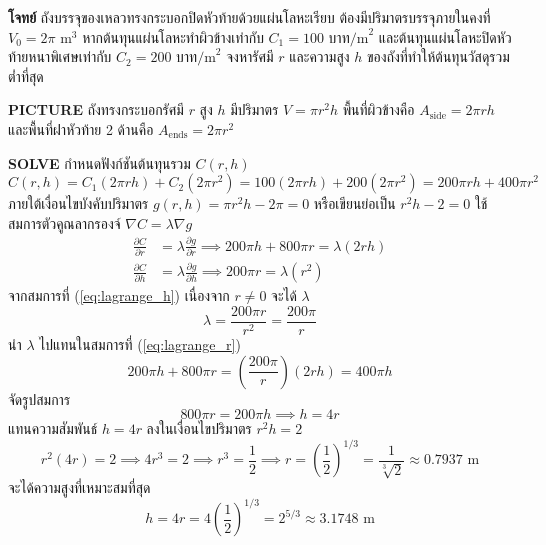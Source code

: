 \begin{mathexample}
\textbf{โจทย์} ถังบรรจุของเหลวทรงกระบอกปิดหัวท้ายด้วยแผ่นโลหะเรียบ ต้องมีปริมาตรบรรจุภายในคงที่ $V_0 = 2\pi\text{ m}^3$ หากต้นทุนแผ่นโลหะทำผิวข้างเท่ากับ $C_1 = 100\text{ บาท/m}^2$ และต้นทุนแผ่นโลหะปิดหัวท้ายหนาพิเศษเท่ากับ $C_2 = 200\text{ บาท/m}^2$ จงหารัศมี $r$ และความสูง $h$ ของถังที่ทำให้ต้นทุนวัสดุรวมต่ำที่สุด

\vspace{0.2cm}
\textbf{PICTURE} ถังทรงกระบอกรัศมี $r$ สูง $h$ มีปริมาตร $V = \pi r^2 h$ พื้นที่ผิวข้างคือ $A_{\text{side}} = 2\pi r h$ และพื้นที่ฝาหัวท้าย 2 ด้านคือ $A_{\text{ends}} = 2\pi r^2$

\vspace{0.2cm}
\textbf{SOLVE}
กำหนดฟังก์ชันต้นทุนรวม $C(r, h)$
\begin{equation}
C(r, h) = C_1(2\pi r h) + C_2(2\pi r^2) = 100(2\pi r h) + 200(2\pi r^2) = 200\pi r h + 400\pi r^2
\end{equation}
ภายใต้เงื่อนไขบังคับปริมาตร $g(r, h) = \pi r^2 h - 2\pi = 0$ หรือเขียนย่อเป็น $r^2 h - 2 = 0$
ใช้สมการตัวคูณลากรองจ์ $\nabla C = \lambda \nabla g$
\begin{align}
\frac{\partial C}{\partial r} &= \lambda \frac{\partial g}{\partial r} \implies 200\pi h + 800\pi r = \lambda (2r h) \label{eq:lagrange_r} \\
\frac{\partial C}{\partial h} &= \lambda \frac{\partial g}{\partial h} \implies 200\pi r = \lambda (r^2) \label{eq:lagrange_h}
\end{align}
จากสมการที่ (\ref{eq:lagrange_h}) เนื่องจาก $r \neq 0$ จะได้ $\lambda$
\begin{equation}
\lambda = \frac{200\pi r}{r^2} = \frac{200\pi}{r}
\end{equation}
นำ $\lambda$ ไปแทนในสมการที่ (\ref{eq:lagrange_r})
\begin{equation}
200\pi h + 800\pi r = \left(\frac{200\pi}{r}\right)(2r h) = 400\pi h
\end{equation}
จัดรูปสมการ
\begin{equation}
800\pi r = 200\pi h \implies h = 4r
\end{equation}
แทนความสัมพันธ์ $h = 4r$ ลงในเงื่อนไขปริมาตร $r^2 h = 2$
\begin{equation}
r^2(4r) = 2 \implies 4r^3 = 2 \implies r^3 = \frac{1}{2} \implies r = \left(\frac{1}{2}\right)^{1/3} = \frac{1}{\sqrt[3]{2}} \approx 0.7937\text{ m}
\end{equation}
จะได้ความสูงที่เหมาะสมที่สุด
\begin{equation}
h = 4r = 4\left(\frac{1}{2}\right)^{1/3} = 2^{5/3} \approx 3.1748\text{ m}
\end{equation}


\end{mathexample}
